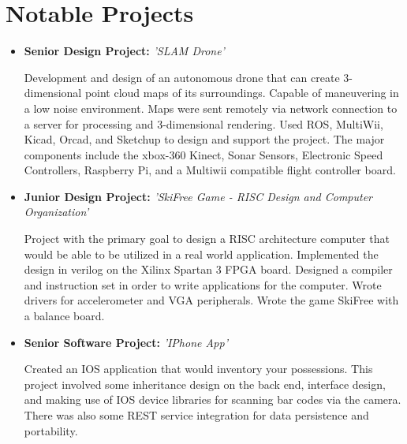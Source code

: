 \documentclass[11pt,a4paper,sans]{moderncv}        %
\begin{document}
\section{Notable Projects}

\vspace{5pt}

\begin{itemize}

\item{\textbf{Senior Design Project:} \textit{'SLAM Drone'}

\vspace{3pt}

\small{Development and design of an autonomous drone that can create 3-dimensional point cloud maps of its surroundings. Capable of maneuvering in a low noise environment. Maps were sent remotely via network connection to a server for processing and 3-dimensional rendering. Used ROS, MultiWii, Kicad, Orcad, and Sketchup to design and support the project. The major components include the xbox-360 Kinect, Sonar Sensors, Electronic Speed Controllers, Raspberry Pi, and a Multiwii compatible flight controller board.}}

\vspace{6pt}

\item{\textbf{Junior Design Project:} \textit{'SkiFree Game - RISC Design and Computer Organization'}

\vspace{3pt} 

\small{Project with the primary goal to design a RISC architecture computer that would be able to be utilized in a real world application. Implemented the design in verilog on the Xilinx Spartan 3 FPGA board. Designed a compiler and instruction set in order to write applications for the computer. Wrote drivers for accelerometer and VGA peripherals. Wrote the game SkiFree with a balance board.}}

\vspace{6pt}

\item{\textbf{Senior Software Project:} \textit{'IPhone App'}

\vspace{3pt}

\small{Created an IOS application that would inventory your possessions. This project involved some inheritance design on the back end, interface design, and making use of IOS device libraries for scanning bar codes via the camera. There was also some REST service integration for data persistence and portability. }}


\end{itemize}
\end{document}
